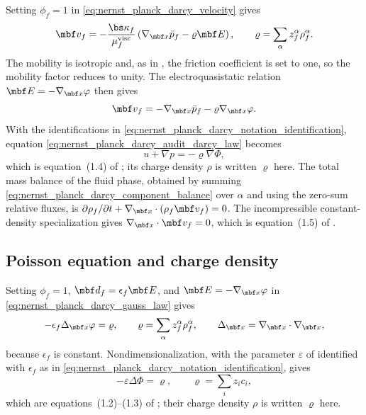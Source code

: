 Setting \(\phi_f=1\) in \eqref{eq:nernst_planck_darcy_velocity} gives
%
\begin{equation}
	\mbf v_f
	=
	-\frac{\bs\kappa_f}{\mu_f^{\mathrm{visc}}}
	\left(
		\nabla_{\mbf x}\bar p_f-\varrho\mbf E
	\right),
	\qquad
	\varrho=\sum_\alpha z_f^\alpha\rho_f^\alpha .
	\label{eq:nernst_planck_darcy_audit_velocity_rescaled}
\end{equation}
%
The mobility is isotropic and, as in
\cite{ignatova2021charged_fluids}, the friction coefficient is set to one, so
the mobility factor reduces to unity.  The electroquasistatic relation
\(\mbf E=-\nabla_{\mbf x}\varphi\) then gives
%
\begin{equation}
	\mbf v_f
	=
	-\nabla_{\mbf x}\bar p_f-\varrho\nabla_{\mbf x}\varphi .
	\label{eq:nernst_planck_darcy_audit_darcy_law}
\end{equation}
%
With the identifications in
\eqref{eq:nernst_planck_darcy_notation_identification}, equation
\eqref{eq:nernst_planck_darcy_audit_darcy_law} becomes
%
\begin{equation}
	u+\nabla p=-\varrho\nabla\Phi,
	\label{eq:nernst_planck_darcy_audit_recovered_darcy}
\end{equation}
%
which is equation~(1.4) of \cite{ignatova2021charged_fluids}; its charge
density \(\rho\) is written \(\varrho\) here.  The total
mass balance of the fluid phase, obtained by summing
\eqref{eq:nernst_planck_darcy_component_balance} over \(\alpha\) and using
the zero-sum relative fluxes, is
\(\partial\rho_f/\partial t+\nabla_{\mbf x}\cdot(\rho_f\mbf v_f)=0\).
The incompressible constant-density specialization gives
\(\nabla_{\mbf x}\cdot\mbf v_f=0\), which is equation~(1.5) of
\cite{ignatova2021charged_fluids}.

\subsection{Poisson equation and charge density}

Setting \(\phi_f=1\), \(\mbf d_f=\epsilon_f\mbf E\), and
\(\mbf E=-\nabla_{\mbf x}\varphi\) in
\eqref{eq:nernst_planck_darcy_gauss_law} gives
%
\begin{equation}
	-\epsilon_f\Delta_{\mbf x}\varphi
	=
	\varrho,
	\qquad
	\varrho=\sum_\alpha z_f^\alpha\rho_f^\alpha,
	\qquad
	\Delta_{\mbf x}=\nabla_{\mbf x}\cdot\nabla_{\mbf x},
	\label{eq:nernst_planck_darcy_audit_poisson}
\end{equation}
%
because \(\epsilon_f\) is constant.  Nondimensionalization, with the
parameter \(\varepsilon\) of \cite{ignatova2021charged_fluids} identified
with \(\epsilon_f\) as in
\eqref{eq:nernst_planck_darcy_notation_identification}, gives
%
\begin{equation}
	-\varepsilon\Delta\Phi=\varrho,
	\qquad
	\varrho=\sum_i z_i c_i,
	\label{eq:nernst_planck_darcy_audit_recovered_poisson}
\end{equation}
%
which are equations~(1.2)--(1.3) of \cite{ignatova2021charged_fluids}; their
charge density \(\rho\) is written \(\varrho\) here.

